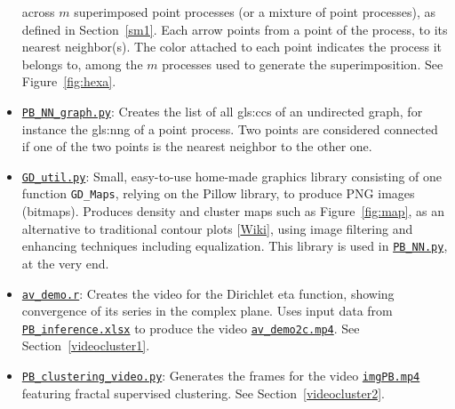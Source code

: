 \documentclass[10pt]{article}
\begin{document}
\begin{itemize}
     across $m$ superimposed point processes (or a mixture of point processes), as defined in Section~\ref{sm1}. Each arrow points from a point of the process, to its nearest neighbor(s). 
    The color attached to each point indicates the process it belongs to, among the $m$ processes used to generate the superimposition. See
    Figure~\ref{fig:hexa}.
\item \href{https://github.com/VincentGranville/Point-Processes/blob/main/Source\%20Code/PB_NN_graph.py}{\texttt{PB\_NN\_graph.py}}: Creates the list of all 
\glspl{gls:cc} of an 
\textcolor{index}{undirected graph}, 
for instance the  \gls{gls:nng}
 of a point process. Two points are considered connected if one of the two points is the nearest neighbor to the other one. 
\item \href{https://github.com/VincentGranville/Point-Processes/blob/main/Source\%20Code/PB_NN_graph.py}{\texttt{GD\_util.py}}: Small, easy-to-use home-made graphics library
consisting of one function \texttt{GD\_Maps}, relying on the Pillow library, to produce PNG images (bitmaps). Produces
density and cluster maps such as Figure~\ref{fig:map}, as an alternative to traditional contour plots [\href{https://scipython.com/book/chapter-7-matplotlib/examples/a-simple-contour-plot/}{Wiki}], using image filtering and enhancing techniques including
equalization. This library is used in
 \href{https://github.com/VincentGranville/Point-Processes/blob/main/Source\%20Code/PB_NN.py}{\texttt{PB\_NN.py}}, at the very end.

\item \href{https://github.com/VincentGranville/Point-Processes/blob/main/Videos/av_demo.r}{\texttt{av\_demo.r}}: Creates the video for the 
\textcolor{index}{Dirichlet eta function}, showing
convergence of its series in the complex plane. Uses input data from 
\href{https://github.com/VincentGranville/Point-Processes/tree/main/Spreadsheets}{\texttt{PB\_inference.xlsx}} to produce the video
\href{https://www.youtube.com/watch?v=FUxAeW4JEXA}{\texttt{av\_demo2c.mp4}}. See Section~\ref{videocluster1}.

\item \href{https://github.com/VincentGranville/Point-Processes/blob/main/Videos/PB_clustering_video.py}{\texttt{PB\_clustering\_video.py}}: Generates the frames for
the video  \href{https://www.youtube.com/watch?v=dNPSEh-X6uw}{\texttt{imgPB.mp4}} featuring \textcolor{index}{fractal supervised clustering}. See Section~\ref{videocluster2}.

\end{itemize}
\end{document}
